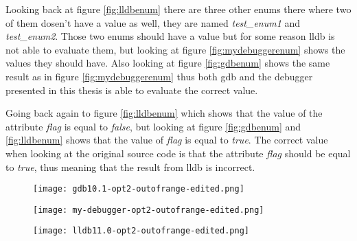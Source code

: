 Looking back at figure \ref{fig:lldbenum} there are three other enums there where two of them dosen't have a value as well, they are named \emph{test\_enum1} and \emph{test\_enum2}.
Those two enums should have a value but for some reason \gls{lldb} is not able to evaluate them, but looking at figure \ref{fig:mydebuggerenum} shows the values they should have.
Also looking at figure \ref{fig:gdbenum} shows the same result as in figure \ref{fig:mydebuggerenum} thus both \gls{gdb} and the debugger presented in this thesis is able to evaluate the correct value.

Going back again to figure \ref{fig:lldbenum} which shows that the value of the attribute \emph{flag} is equal to \emph{false}, but looking at figure \ref{fig:gdbenum} and \ref{fig:lldbenum} shows that the value of \emph{flag} is equal to \emph{true}.
The correct value when looking at the original source code is that the attribute \emph{flag} should be equal to \emph{true}, thus meaning that the result from \gls{lldb} is incorrect.




\begin{figure}[h]
    \centering
    \texttt{[image: gdb10.1-opt2-outofrange-edited.png]}
    \label{fig:gdboutofrange}
\end{figure}


\begin{figure}[h]
    \centering
    \texttt{[image: my-debugger-opt2-outofrange-edited.png]}
    \label{fig:mydebuggeroutofrange}
\end{figure}


\begin{figure}[h]
    \centering
    \texttt{[image: lldb11.0-opt2-outofrange-edited.png]}
    \label{fig:lldboutofrange}
\end{figure}


